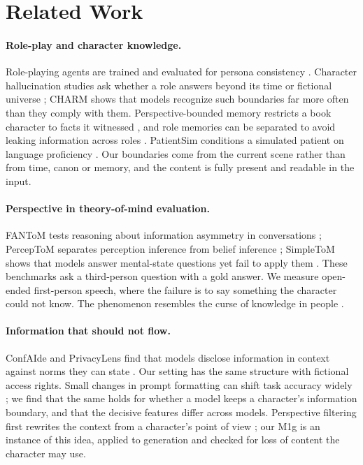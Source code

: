 \section{Related Work}
\paragraph{Role-play and character knowledge.} Role-playing agents are trained and evaluated for persona consistency \citep{shao-etal-2023-character,wang-etal-2024-rolellm}. Character hallucination studies ask whether a role answers beyond its time or fictional universe \citep{ahn-etal-2024-timechara,han2026charm}; CHARM shows that models recognize such boundaries far more often than they comply with them. Perspective-bounded memory restricts a book character to facts it witnessed \citep{tang2026staying}, and role memories can be separated to avoid leaking information across roles \citep{zhu2026mentor}. PatientSim conditions a simulated patient on language proficiency \citep{kyung2025patientsim}. Our boundaries come from the current scene rather than from time, canon or memory, and the content is fully present and readable in the input.

\paragraph{Perspective in theory-of-mind evaluation.} FANToM tests reasoning about information asymmetry in conversations \citep{kim-etal-2023-fantom}; PercepToM separates perception inference from belief inference \citep{jung-etal-2024-perceptions}; SimpleToM shows that models answer mental-state questions yet fail to apply them \citep{gu2026simpletom}. These benchmarks ask a third-person question with a gold answer. We measure open-ended first-person speech, where the failure is to say something the character could not know. The phenomenon resembles the curse of knowledge in people \citep{birch2007curse}.

\paragraph{Information that should not flow.} ConfAIde and PrivacyLens find that models disclose information in context against norms they can state \citep{mireshghallah2024confaide,shao2024privacylens}. Our setting has the same structure with fictional access rights. Small changes in prompt formatting can shift task accuracy widely \citep{sclar2024quantifying}; we find that the same holds for whether a model keeps a character's information boundary, and that the decisive features differ across models. Perspective filtering first rewrites the context from a character's point of view \citep{wilf-etal-2024-think}; our M1g is an instance of this idea, applied to generation and checked for loss of content the character may use.

